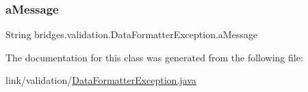 \subsubsection{\texorpdfstring{a\+Message}{aMessage}}
{\footnotesize\ttfamily String bridges.\+validation.\+Data\+Formatter\+Exception.\+a\+Message}



The documentation for this class was generated from the following file\+:\begin{DoxyCompactItemize}
\item 
link/validation/\hyperlink{_data_formatter_exception_8java}{Data\+Formatter\+Exception.\+java}\end{DoxyCompactItemize}
